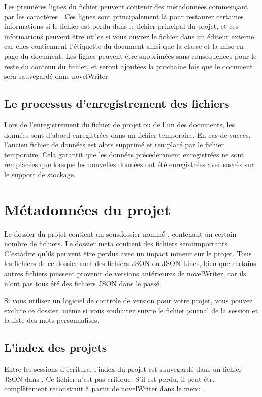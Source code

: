 \documentclass[a4paper,11pt,french]{sphinxmanual}
\begin{document}
\sphinxAtStartPar
Les premières lignes du fichier peuvent contenir des métadonnées commençant par les caractères \sphinxcode{\sphinxupquote{\%\%\textasciitilde{}}}. Ces lignes sont principalement là pour restaurer certaines informations si le fichier est perdu dans le fichier principal du projet, et ces informations peuvent être utiles si vous ouvrez le fichier dans un éditeur externe car elles contiennent l’étiquette du document ainsi que la classe et la mise en page du document. Les lignes peuvent être supprimées sans conséquences pour le reste du contenu du fichier, et seront ajoutées la prochaine fois que le document sera sauvegardé dans novelWriter.


\subsection{Le processus d’enregistrement des fichiers}
\label{\detokenize{tech_storage:the-file-saving-process}}
\sphinxAtStartPar
Lors de l’enregistrement du fichier de projet ou de l’un des documents, les données sont d’abord enregistrées dans un fichier temporaire. En cas de succès, l’ancien fichier de données est alors supprimé et remplacé par le fichier temporaire. Cela garantit que les données précédemment enregistrées ne sont remplacées que lorsque les nouvelles données ont été enregistrées avec succès sur le support de stockage.


\section{Métadonnées du projet}
\label{\detokenize{tech_storage:project-meta-data}}
\sphinxAtStartPar
Le dossier du projet contient un sous\sphinxhyphen{}dossier nommé , contenant un certain nombre de fichiers. Le dossier meta contient des fichiers semi\sphinxhyphen{}importants. C’est\sphinxhyphen{}à\sphinxhyphen{}dire qu’ils peuvent être perdus avec un impact mineur sur le projet. Tous les fichiers de ce dossier sont des fichiers JSON ou JSON Lines, bien que certains autres fichiers puissent provenir de versions antérieures de novelWriter, car ils n’ont pas tous été des fichiers JSON dans le passé.

\sphinxAtStartPar
Si vous utilisez un logiciel de contrôle de version pour votre projet, vous pouvez exclure ce dossier, même si vous souhaitez suivre le fichier journal de la session et la liste des mots personnalisés.


\subsection{L’index des projets}
\label{\detokenize{tech_storage:the-project-index}}
\sphinxAtStartPar
Entre les sessions d’écriture, l’index du projet est sauvegardé dans un fichier JSON dans . Ce fichier n’est pas critique. S’il est perdu, il peut être complètement reconstruit à partir de novelWriter dans le menu .
\end{document}

